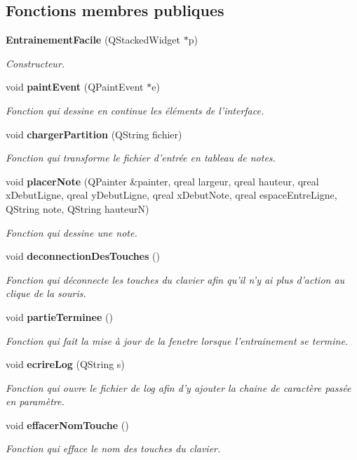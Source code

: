 \subsection*{Fonctions membres publiques}
\begin{DoxyCompactItemize}
\item 
{\bf Entrainement\-Facile} (Q\-Stacked\-Widget $\ast$p)
\begin{DoxyCompactList}\small\item\em Constructeur. \end{DoxyCompactList}\item 
void {\bf paint\-Event} (Q\-Paint\-Event $\ast$e)
\begin{DoxyCompactList}\small\item\em Fonction qui dessine en continue les éléments de l'interface. \end{DoxyCompactList}\item 
void {\bf charger\-Partition} (Q\-String fichier)
\begin{DoxyCompactList}\small\item\em Fonction qui transforme le fichier d'entrée en tableau de notes. \end{DoxyCompactList}\item 
void {\bf placer\-Note} (Q\-Painter \&painter, qreal largeur, qreal hauteur, qreal x\-Debut\-Ligne, qreal y\-Debut\-Ligne, qreal x\-Debut\-Note, qreal espace\-Entre\-Ligne, Q\-String note, Q\-String hauteur\-N)
\begin{DoxyCompactList}\small\item\em Fonction qui dessine une note. \end{DoxyCompactList}\item 
void {\bf deconnection\-Des\-Touches} ()
\begin{DoxyCompactList}\small\item\em Fonction qui déconnecte les touches du clavier afin qu'il n'y ai plus d'action au clique de la souris. \end{DoxyCompactList}\item 
void {\bf partie\-Terminee} ()
\begin{DoxyCompactList}\small\item\em Fonction qui fait la mise à jour de la fenetre lorsque l'entrainement se termine. \end{DoxyCompactList}\item 
void {\bf ecrire\-Log} (Q\-String s)
\begin{DoxyCompactList}\small\item\em Fonction qui ouvre le fichier de log afin d'y ajouter la chaine de caractère passée en paramètre. \end{DoxyCompactList}\item 
void {\bf effacer\-Nom\-Touche} ()
\begin{DoxyCompactList}\small\item\em Fonction qui efface le nom des touches du clavier. \end{DoxyCompactList}\end{DoxyCompactItemize}


